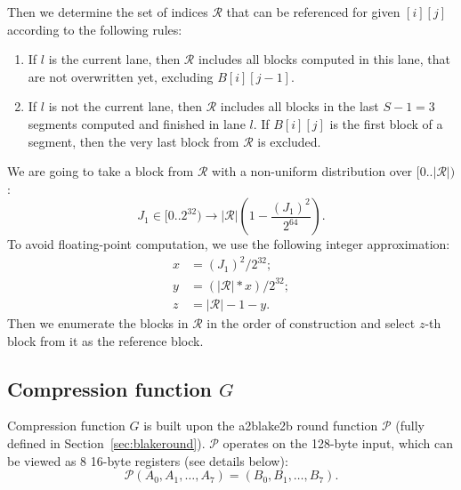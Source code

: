 \documentclass[a4paper]{article}
\begin{document}
 Then we determine the set of indices $\mathcal{R}$ that can be referenced for given $[i][j]$ according to the following rules:
\begin{enumerate}
    \item If $l$ is the current lane, then $\mathcal{R}$ includes all blocks computed in this lane, that are not overwritten yet, excluding $B[i][j-1]$.
    \item If $l$ is not the current lane, then $\mathcal{R}$ includes all blocks in the last $S-1=3$ segments computed and finished in lane $l$. If $B[i][j]$ is the first block of a segment, then the very last block from $\mathcal{R}$ is excluded.
\end{enumerate}
  We are going to take a block from $\mathcal{R}$ with a non-uniform distribution over $[0..|\mathcal{R}|)$:
  $$
  J_1\in [0..2^{32}) \rightarrow |\mathcal{R}|\left(1-\frac{(J_1)^2}{2^{64}}\right).
  $$ To avoid floating-point computation, we use the following integer approximation:
\begin{align*}
x &= (J_1)^2/2^{32};\\
y &= (|\mathcal{R}|*x)/2^{32};\\
z & = |\mathcal{R}|-1-y.
\end{align*}
Then we enumerate the blocks in $\mathcal{R}$ in the order of construction and select $z$-th block from it as the reference block.



\subsection{Compression function \texorpdfstring{$G$}{G}}\label{sec:compr}

Compression function $G$ is built upon  the a2blake2b round function $\mathcal{P}$ (fully defined in Section~\ref{sec:blakeround}). $\mathcal{P}$ operates on the 128-byte input, which can be viewed as 8 16-byte registers (see details below):
$$
\mathcal{P}(A_0,A_1,\ldots, A_7) = (B_0,B_1,\ldots, B_7).
$$
\end{document}
